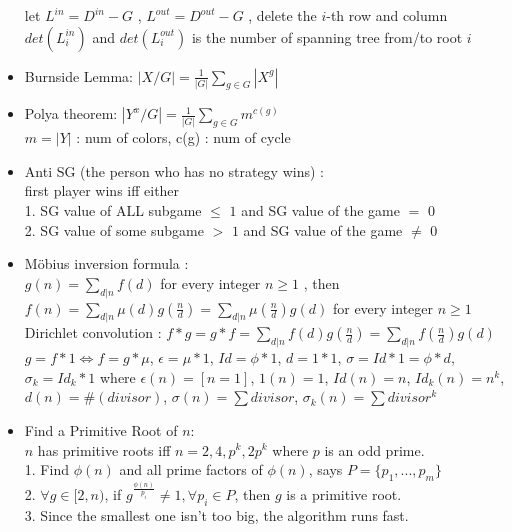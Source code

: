 \begin{itemize}
  let $L^{in} = D^{in} - G$ , $L^{out} = D^{out} - G$ , delete the $i$-th row and column\\
  $det(L_i^{in})$ and $det(L_i^{out})$ is the number of spanning tree from/to root $i$\\
\item Burnside Lemma:
  $|X/G|=\frac{1}{|G|}\sum\limits_{g \in G} {|X^g|}$
\item Polya theorem:
  $|Y^x/G|=\frac{1}{|G|}\sum\limits_{g \in G} {m^{c(g)}}$\\
  $m = |Y|$ : num of colors, c(g) : num of cycle
\item Anti SG (the person who has no strategy wins) :\\
  first player wins iff either\\
  1. SG value of ALL subgame $\le$ $1$ and SG value of the game $=$ $0$\\
  2. SG value of some subgame $>$ $1$ and SG value of the game $\neq$ $0$
\item Möbius inversion formula :\\
  $g(n) = \sum\limits_{d|n}f(d)$ for every integer $n\ge 1$ , then\\
  $f(n) = \sum\limits_{d|n}\mu(d)g(\frac{n}{d}) = \sum\limits_{d|n}\mu(\frac{n}{d})g(d)$ for every integer $n\ge 1$\\
  Dirichlet convolution : $f*g=g*f=\sum\limits_{d|n}f(d)g(\frac{n}{d})=\sum\limits_{d|n}f(\frac{n}{d})g(d)$\\
  $g=f*1\Leftrightarrow f=g*\mu$, $\epsilon=\mu*1$, $Id=\phi*1$, $d=1*1$, $\sigma=Id*1=\phi*d$,\\
  $\sigma_k=Id_k*1$ where $\epsilon(n)=[n=1]$, $1(n)=1$, $Id(n)=n$, $Id_k(n)=n^k$,\\
  $d(n)=\#(divisor)$, $\sigma(n)=\sum divisor$, $\sigma_k(n)=\sum divisor^k$
\item Find a Primitive Root of $n$:\\
  $n$ has primitive roots iff $n=2,4,p^k,2p^k$ where $p$ is an odd prime.\\
  1. Find $\phi(n)$ and all prime factors of $\phi(n)$, says $P=\{p_1,...,p_m\}$\\
  2. $\forall g\in[2,n)$, if $g^{\frac{\phi(n)}{p_i}}\ne 1,\forall p_i\in P$, then $g$ is a primitive root.\\
  3. Since the smallest one isn't too big, the algorithm runs fast.\\

\end{itemize}
